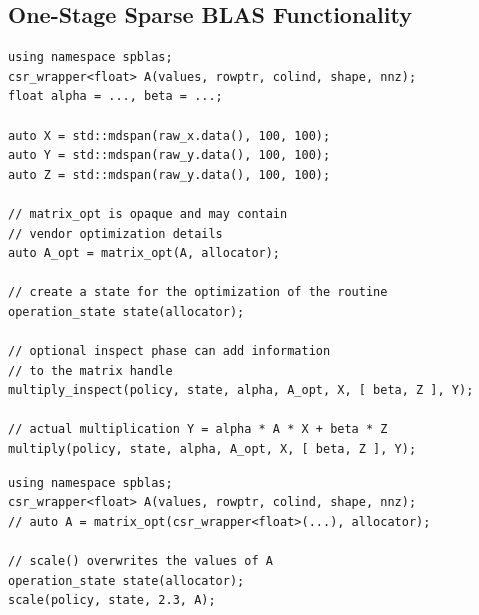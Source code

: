 

\subsection*{One-Stage Sparse BLAS Functionality}



\begin{listing}[H]
\caption{Sparse matrix dense matrix product, $Y = \alpha \cdot A \cdot X  [+ \beta \cdot Z]$, with $X$, $Y$, and $Z$ being dense matrices.}
\begin{verbatim}
using namespace spblas;
csr_wrapper<float> A(values, rowptr, colind, shape, nnz);
float alpha = ..., beta = ...;

auto X = std::mdspan(raw_x.data(), 100, 100);
auto Y = std::mdspan(raw_y.data(), 100, 100);
auto Z = std::mdspan(raw_y.data(), 100, 100);

// matrix_opt is opaque and may contain
// vendor optimization details
auto A_opt = matrix_opt(A, allocator);

// create a state for the optimization of the routine
operation_state state(allocator);

// optional inspect phase can add information
// to the matrix handle
multiply_inspect(policy, state, alpha, A_opt, X, [ beta, Z ], Y);

// actual multiplication Y = alpha * A * X + beta * Z
multiply(policy, state, alpha, A_opt, X, [ beta, Z ], Y);

\end{verbatim}
\end{listing}




\begin{listing}[H]
\caption{Scaling, $A := \alpha A$}
\begin{verbatim}
using namespace spblas;
csr_wrapper<float> A(values, rowptr, colind, shape, nnz);
// auto A = matrix_opt(csr_wrapper<float>(...), allocator);

// scale() overwrites the values of A 
operation_state state(allocator);
scale(policy, state, 2.3, A);
\end{verbatim}
\end{listing}


